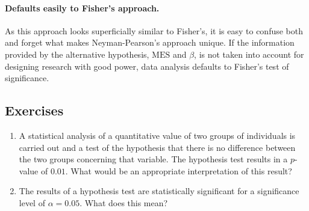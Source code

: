 \documentclass[
]{book}
\theoremstyle{definition}
\theoremstyle{definition}
\theoremstyle{definition}
\theoremstyle{definition}
\theoremstyle{remark}
\begin{document}
\hypertarget{defaults-easily-to-fishers-approach.}{%
\paragraph*{Defaults easily to Fisher's approach.}\label{defaults-easily-to-fishers-approach.}}

As this approach looks superficially similar to Fisher's, it is easy to confuse both and forget what makes Neyman-Pearson's approach unique. If the information provided by the alternative hypothesis, \(\mbox{MES}\) and \(\beta\), is not taken into account for designing research with good power, data analysis defaults to Fisher's test of significance.

\hypertarget{exercises-72}{%
\subsection{Exercises}\label{exercises-72}}

\begin{enumerate}
\def\labelenumi{\arabic{enumi}.}
\item
  A statistical analysis of a quantitative value of two groups of individuals is carried out and a test of the hypothesis that there is no difference between the two groups concerning that variable. The hypothesis test results in a \(p\)-value of \(0.01\). What would be an appropriate interpretation of this result?
\item
  The results of a hypothesis test are statistically significant for a significance level of \(\alpha=0.05\). What does this mean?
\end{enumerate}

  
\end{document}
